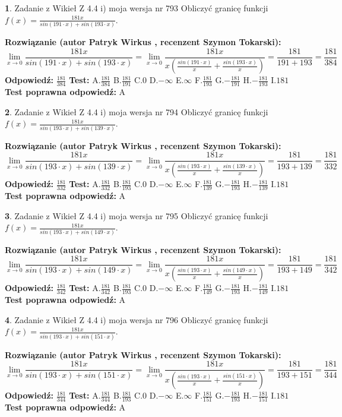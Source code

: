 \documentclass[12pt, a4paper]{article}
\theoremstyle{definition} %
\newtheorem{zad}{}
\newcommand{\zadStart}[1]{\begin{zad}#1\newline}
\newcommand{\zadStop}{\end{zad}}
\newcommand{\rozwStart}[2]{\noindent \textbf{Rozwiązanie (autor #1 , recenzent #2): }\newline}
\newcommand{\rozwStop}{\newline}
\newcommand{\odpStart}{\noindent \textbf{Odpowiedź:}\newline}
\newcommand{\odpStop}{\newline}
\newcommand{\testStart}{\noindent \textbf{Test:}\newline}
\newcommand{\testStop}{\newline}
\newcommand{\kluczStart}{\noindent \textbf{Test poprawna odpowiedź:}\newline}
\newcommand{\kluczStop}{\newline}
\begin{document}
\zadStart{Zadanie z Wikieł Z 4.4 i) moja wersja nr 793}
Obliczyć granicę funkcji $f(x)=\frac{181x}{sin(191\cdot x) +sin(193\cdot x)}$.
\zadStop
\rozwStart{Patryk Wirkus}{Szymon Tokarski}
$$\lim\limits_{x\to 0}\frac{181x}{sin(191\cdot x) +sin(193\cdot x)}=\lim\limits_{x\to 0}\frac{181x}{x(\frac{sin(191\cdot x)}{x}+\frac{sin(193\cdot x)}{x})}=\frac{181}{191+193} = \frac{181}{384}$$
\rozwStop
\odpStart
$\frac{181}{384}$
\odpStop
\testStart
A.$\frac{181}{384}$
B.$\frac{181}{191}$
C.$0$
D.$-\infty$
E.$\infty$
F.$\frac{181}{193}$
G.$-\frac{181}{191}$
H.$-\frac{181}{193}$
I.$181$
\testStop
\kluczStart
A
\kluczStop



\zadStart{Zadanie z Wikieł Z 4.4 i) moja wersja nr 794}
Obliczyć granicę funkcji $f(x)=\frac{181x}{sin(193\cdot x) +sin(139\cdot x)}$.
\zadStop
\rozwStart{Patryk Wirkus}{Szymon Tokarski}
$$\lim\limits_{x\to 0}\frac{181x}{sin(193\cdot x) +sin(139\cdot x)}=\lim\limits_{x\to 0}\frac{181x}{x(\frac{sin(193\cdot x)}{x}+\frac{sin(139\cdot x)}{x})}=\frac{181}{193+139} = \frac{181}{332}$$
\rozwStop
\odpStart
$\frac{181}{332}$
\odpStop
\testStart
A.$\frac{181}{332}$
B.$\frac{181}{193}$
C.$0$
D.$-\infty$
E.$\infty$
F.$\frac{181}{139}$
G.$-\frac{181}{193}$
H.$-\frac{181}{139}$
I.$181$
\testStop
\kluczStart
A
\kluczStop



\zadStart{Zadanie z Wikieł Z 4.4 i) moja wersja nr 795}
Obliczyć granicę funkcji $f(x)=\frac{181x}{sin(193\cdot x) +sin(149\cdot x)}$.
\zadStop
\rozwStart{Patryk Wirkus}{Szymon Tokarski}
$$\lim\limits_{x\to 0}\frac{181x}{sin(193\cdot x) +sin(149\cdot x)}=\lim\limits_{x\to 0}\frac{181x}{x(\frac{sin(193\cdot x)}{x}+\frac{sin(149\cdot x)}{x})}=\frac{181}{193+149} = \frac{181}{342}$$
\rozwStop
\odpStart
$\frac{181}{342}$
\odpStop
\testStart
A.$\frac{181}{342}$
B.$\frac{181}{193}$
C.$0$
D.$-\infty$
E.$\infty$
F.$\frac{181}{149}$
G.$-\frac{181}{193}$
H.$-\frac{181}{149}$
I.$181$
\testStop
\kluczStart
A
\kluczStop



\zadStart{Zadanie z Wikieł Z 4.4 i) moja wersja nr 796}
Obliczyć granicę funkcji $f(x)=\frac{181x}{sin(193\cdot x) +sin(151\cdot x)}$.
\zadStop
\rozwStart{Patryk Wirkus}{Szymon Tokarski}
$$\lim\limits_{x\to 0}\frac{181x}{sin(193\cdot x) +sin(151\cdot x)}=\lim\limits_{x\to 0}\frac{181x}{x(\frac{sin(193\cdot x)}{x}+\frac{sin(151\cdot x)}{x})}=\frac{181}{193+151} = \frac{181}{344}$$
\rozwStop
\odpStart
$\frac{181}{344}$
\odpStop
\testStart
A.$\frac{181}{344}$
B.$\frac{181}{193}$
C.$0$
D.$-\infty$
E.$\infty$
F.$\frac{181}{151}$
G.$-\frac{181}{193}$
H.$-\frac{181}{151}$
I.$181$
\testStop
\kluczStart
A
\kluczStop
\end{document}
